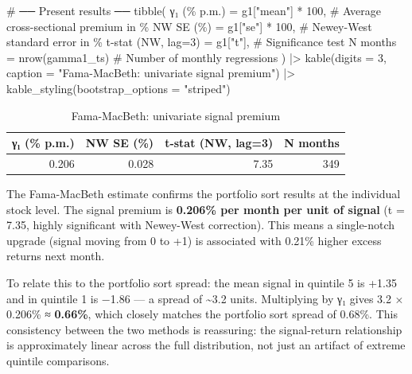 \documentclass[
  letterpaper,
  DIV=11,
  numbers=noendperiod]{scrartcl}
\newenvironment{Shaded}{\begin{snugshade}}{\end{snugshade}}
\newcommand{\AttributeTok}[1]{\textcolor[rgb]{0.40,0.45,0.13}{#1}}
\newcommand{\CommentTok}[1]{\textcolor[rgb]{0.37,0.37,0.37}{#1}}
\newcommand{\DecValTok}[1]{\textcolor[rgb]{0.68,0.00,0.00}{#1}}
\newcommand{\FunctionTok}[1]{\textcolor[rgb]{0.28,0.35,0.67}{#1}}
\newcommand{\NormalTok}[1]{\textcolor[rgb]{0.00,0.23,0.31}{#1}}
\newcommand{\OtherTok}[1]{\textcolor[rgb]{0.00,0.23,0.31}{#1}}
\newcommand{\SpecialCharTok}[1]{\textcolor[rgb]{0.37,0.37,0.37}{#1}}
\newcommand{\StringTok}[1]{\textcolor[rgb]{0.13,0.47,0.30}{#1}}
\begin{document}
\begin{Shaded}
\begin{Highlighting}[]
\CommentTok{\# ── Present results ──}
\FunctionTok{tibble}\NormalTok{(}
  \StringTok{\textasciigrave{}}\AttributeTok{γ₁ (\% p.m.)}\StringTok{\textasciigrave{}} \OtherTok{=}\NormalTok{ g1[}\StringTok{"mean"}\NormalTok{] }\SpecialCharTok{*} \DecValTok{100}\NormalTok{,     }\CommentTok{\# Average cross{-}sectional premium in \%}
  \StringTok{\textasciigrave{}}\AttributeTok{NW SE (\%)}\StringTok{\textasciigrave{}} \OtherTok{=}\NormalTok{ g1[}\StringTok{"se"}\NormalTok{] }\SpecialCharTok{*} \DecValTok{100}\NormalTok{,          }\CommentTok{\# Newey{-}West standard error in \%}
  \StringTok{\textasciigrave{}}\AttributeTok{t{-}stat (NW, lag=3)}\StringTok{\textasciigrave{}} \OtherTok{=}\NormalTok{ g1[}\StringTok{"t"}\NormalTok{],        }\CommentTok{\# Significance test}
  \StringTok{\textasciigrave{}}\AttributeTok{N months}\StringTok{\textasciigrave{}} \OtherTok{=} \FunctionTok{nrow}\NormalTok{(gamma1\_ts)           }\CommentTok{\# Number of monthly regressions}
\NormalTok{) }\SpecialCharTok{|\textgreater{}}
  \FunctionTok{kable}\NormalTok{(}\AttributeTok{digits =} \DecValTok{3}\NormalTok{, }\AttributeTok{caption =} \StringTok{"Fama{-}MacBeth: univariate signal premium"}\NormalTok{) }\SpecialCharTok{|\textgreater{}}
  \FunctionTok{kable\_styling}\NormalTok{(}\AttributeTok{bootstrap\_options =} \StringTok{"striped"}\NormalTok{)}
\end{Highlighting}
\end{Shaded}

\begin{longtable}[t]{rrrr}
\caption{\label{tab:fama-macbeth}Fama-MacBeth: univariate signal premium}\\
\toprule
γ₁ (\% p.m.) & NW SE (\%) & t-stat (NW, lag=3) & N months\\
\midrule
0.206 & 0.028 & 7.35 & 349\\
\bottomrule
\end{longtable}

The Fama-MacBeth estimate confirms the portfolio sort results at the
individual stock level. The signal premium is \textbf{0.206\% per month
per unit of signal} (t = 7.35, highly significant with Newey-West
correction). This means a single-notch upgrade (signal moving from 0 to
+1) is associated with 0.21\% higher excess returns next month.

To relate this to the portfolio sort spread: the mean signal in quintile
5 is +1.35 and in quintile 1 is −1.86 --- a spread of \textasciitilde3.2
units. Multiplying by γ₁ gives 3.2 × 0.206\% ≈ \textbf{0.66\%}, which
closely matches the portfolio sort spread of 0.68\%. This consistency
between the two methods is reassuring: the signal-return relationship is
approximately linear across the full distribution, not just an artifact
of extreme quintile comparisons.
\end{document}
